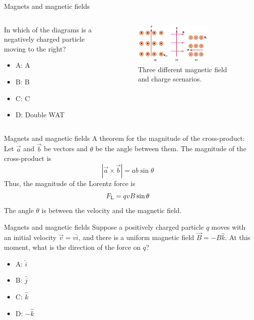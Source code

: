 \documentclass{beamer}
\begin{document}
\begin{frame}{Magnets and magnetic fields}
\begin{columns}[T]
\begin{column}{0.3\textwidth}
In which of the diagrams is a negatively charged particle moving to the right?
\begin{itemize}
\item A: A
\item B: B
\item C: C
\item D: Double WAT
\end{itemize}
\end{column}
\begin{column}{0.7\textwidth}
\begin{figure}
\centering
\includegraphics[width=0.75\textwidth]{figures/lorentzProblem.png}
\caption{\label{fig:lorentzProblem5} Three different magnetic field and charge scenarios.}
\end{figure}
\end{column}
\end{columns}
\end{frame}

\begin{frame}{Magnets and magnetic fields}
A theorem for the magnitude of the cross-product:  Let $\vec{a}$ and $\vec{b}$ be vectors and $\theta$ be the angle between them.  The magnitude of the cross-product is
\begin{equation}
|\vec{a} \times \vec{b}| =  a b \sin\theta
\end{equation}
Thus, the magnitude of the Lorentz force is
\begin{equation}
F_{\rm L} = q v B \sin\theta
\end{equation}
The angle $\theta$ is between the velocity and the magnetic field.
\end{frame}

\begin{frame}{Magnets and magnetic fields}
Suppose a positively charged particle $q$ moves with an initial velocity $\vec{v} = v \hat{i}$, and there is a uniform magnetic field $\vec{B} = -B\hat{k}$.  At this moment, what is the direction of the force on $q$?
\begin{itemize}
\item A: $\hat{i}$
\item B: $\hat{j}$
\item C: $\hat{k}$
\item D: $-\hat{k}$
\end{itemize}
\end{frame}
\end{document}
